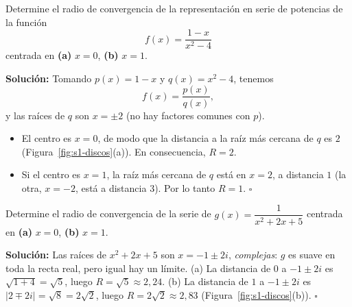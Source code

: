 \begin{example}
Determine el radio de convergencia de la representación en serie de potencias de la función
\[ f(x) = \frac{1 - x}{x^2 - 4} \]
centrada en \textbf{(a)} $x = 0$, \textbf{(b)} $x = 1$.
 
\noindent \textbf{Solución:} \quad Tomando $p(x) = 1 - x$ y $q(x) = x^2 - 4$, tenemos
\[ f(x) = \frac{p(x)}{q(x)}, \]
y las raíces de $q$ son $x = \pm 2$ (no hay factores comunes con $p$).
 
\begin{itemize}
    \item[\textbf{(a)}] El centro es $x = 0$, de modo que la distancia a la raíz más cercana de $q$ es $2$ (Figura~\ref{fig:s1-discos}(a)). En consecuencia, $R = 2$.
    \item[\textbf{(b)}] Si el centro es $x = 1$, la raíz más cercana de $q$ está en $x = 2$, a distancia $1$ (la otra, $x=-2$, está a distancia $3$). Por lo tanto $R = 1$. \hfill $\square$
\end{itemize}
\end{example}
 
\begin{example}
Determine el radio de convergencia de la serie de $g(x)=\dfrac{1}{x^2+2x+5}$ centrada en \textbf{(a)} $x=0$, \textbf{(b)} $x=1$.
 
\noindent \textbf{Solución:} \quad Las raíces de $x^2+2x+5$ son $x=-1\pm 2i$, \emph{complejas}: $g$ es suave en toda la recta real, pero igual hay un límite. (a) La distancia de $0$ a $-1\pm 2i$ es $\sqrt{1+4}=\sqrt{5}$, luego $R=\sqrt5\approx 2{,}24$. (b) La distancia de $1$ a $-1\pm2i$ es $|2\mp 2i|=\sqrt{8}=2\sqrt2$, luego $R=2\sqrt2\approx 2{,}83$ (Figura~\ref{fig:s1-discos}(b)). \hfill $\square$
\end{example}
 
